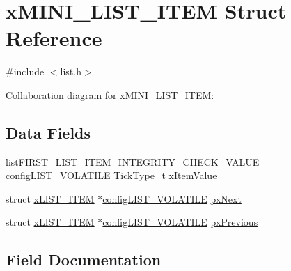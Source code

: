 \hypertarget{structx_m_i_n_i___l_i_s_t___i_t_e_m}{}\section{x\+M\+I\+N\+I\+\_\+\+L\+I\+S\+T\+\_\+\+I\+T\+EM Struct Reference}
\label{structx_m_i_n_i___l_i_s_t___i_t_e_m}


{\ttfamily \#include $<$list.\+h$>$}



Collaboration diagram for x\+M\+I\+N\+I\+\_\+\+L\+I\+S\+T\+\_\+\+I\+T\+EM\+:
\subsection*{Data Fields}
\begin{DoxyCompactItemize}
\item 
\hyperlink{list_8h_a3611bd5d5d87cb26ac1dc7a4852b94a0}{list\+F\+I\+R\+S\+T\+\_\+\+L\+I\+S\+T\+\_\+\+I\+T\+E\+M\+\_\+\+I\+N\+T\+E\+G\+R\+I\+T\+Y\+\_\+\+C\+H\+E\+C\+K\+\_\+\+V\+A\+L\+UE} \hyperlink{list_8h_a2d5de557c5561c8980d1bf51d87d8cba}{config\+L\+I\+S\+T\+\_\+\+V\+O\+L\+A\+T\+I\+LE} \hyperlink{portmacro_8h_aa69c48c6e902ce54f70886e6573c92a9}{Tick\+Type\+\_\+t} \hyperlink{structx_m_i_n_i___l_i_s_t___i_t_e_m_aa6f3caf3e73107fb0da6fede4b06f104}{x\+Item\+Value}
\item 
struct \hyperlink{structx_l_i_s_t___i_t_e_m}{x\+L\+I\+S\+T\+\_\+\+I\+T\+EM} $\ast$\hyperlink{list_8h_a2d5de557c5561c8980d1bf51d87d8cba}{config\+L\+I\+S\+T\+\_\+\+V\+O\+L\+A\+T\+I\+LE} \hyperlink{structx_m_i_n_i___l_i_s_t___i_t_e_m_a77927cd93dda0c59b3855aca58881ca1}{px\+Next}
\item 
struct \hyperlink{structx_l_i_s_t___i_t_e_m}{x\+L\+I\+S\+T\+\_\+\+I\+T\+EM} $\ast$\hyperlink{list_8h_a2d5de557c5561c8980d1bf51d87d8cba}{config\+L\+I\+S\+T\+\_\+\+V\+O\+L\+A\+T\+I\+LE} \hyperlink{structx_m_i_n_i___l_i_s_t___i_t_e_m_a0294e93ecc18bcdb723038af1027505d}{px\+Previous}
\end{DoxyCompactItemize}


\subsection{Field Documentation}
\mbox{\label{structx_m_i_n_i___l_i_s_t___i_t_e_m_a77927cd93dda0c59b3855aca58881ca1}} 
